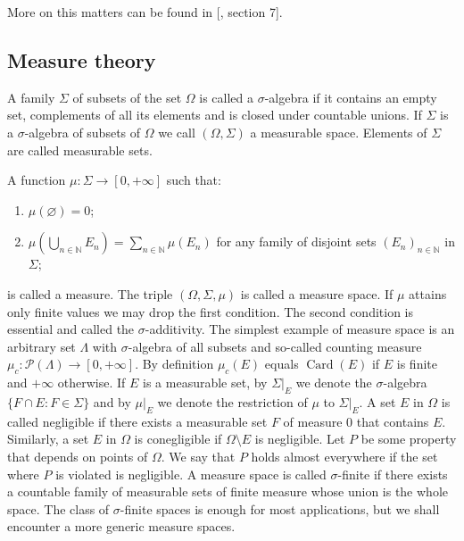 More on this matters can be found in [\cite{BourbElemMathGenTopLivIII}, section
7].



\subsection{
  Measure theory}\label{SubSectionMeasureTheory}

A family $\Sigma$ of subsets of the set $\Omega$ is called a $\sigma$-algebra if
it contains an empty set, complements of all its elements and is closed
under countable unions. If $\Sigma$ is a $\sigma$-algebra of subsets of $\Omega$
we call $(\Omega,\Sigma)$ a measurable space. Elements of $\Sigma$ are called
measurable sets. 

A function $\mu:\Sigma\to[0,+\infty]$ such that:  
\begin{enumerate}[label = (\roman*)]
  \item $\mu(\varnothing)=0$; 

  \item $\mu\left(\bigcup\limits_{n\in\mathbb{N}} E_n\right)
  =\sum\limits_{n\in\mathbb{N}}\mu(E_n)$ for any family of disjoint sets
  ${(E_n)}_{n\in\mathbb{N}}$ in $\Sigma$; 
\end{enumerate}

is called a measure. The triple $(\Omega,\Sigma,\mu)$ is called a measure space.
If $\mu$ attains only finite values we may drop the first condition. The second
condition is essential and called the $\sigma$-additivity. The simplest example
of measure space is an  arbitrary set $\Lambda$ with $\sigma$-algebra of all
subsets and so-called counting measure
$\mu_c:\mathcal{P}(\Lambda)\to[0,+\infty]$. By definition $\mu_c(E)$ equals
$\operatorname{Card}(E)$ if $E$ is finite and $+\infty$ otherwise. If $E$ is a
measurable set, by $\Sigma|_E$ we denote the $\sigma$-algebra $ \{F\cap
E:F\in\Sigma \}$ and by $\mu|_E$ we denote the restriction of $\mu$ to
$\Sigma|_E$. A set $E$ in $\Omega$ is called negligible if there exists a
measurable set $F$ of measure $0$ that contains $E$. Similarly, a set $E$ in
$\Omega$ is conegligible if $\Omega\setminus E$ is negligible. Let $P$ be some
property that depends on points of $\Omega$. We say that $P$ holds almost
everywhere if the set where $P$ is violated is negligible. A measure space is
called $\sigma$-finite if there exists a countable family of measurable sets of
finite measure whose union is the whole space. The class of $\sigma$-finite
spaces is enough for most applications, but we shall encounter a more generic
measure spaces.

